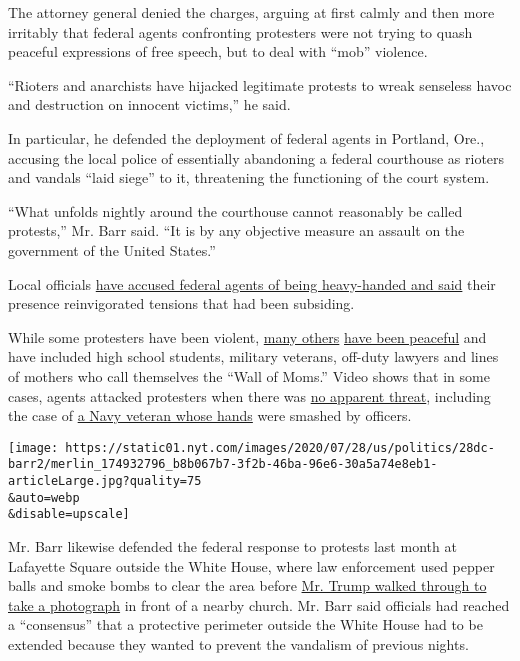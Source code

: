 The attorney general denied the charges, arguing at first calmly and
then more irritably that federal agents confronting protesters were not
trying to quash peaceful expressions of free speech, but to deal with
``mob'' violence.

``Rioters and anarchists have hijacked legitimate protests to wreak
senseless havoc and destruction on innocent victims,'' he said.

In particular, he defended the deployment of federal agents in Portland,
Ore., accusing the local police of essentially abandoning a federal
courthouse as rioters and vandals ``laid siege'' to it, threatening the
functioning of the court system.

``What unfolds nightly around the courthouse cannot reasonably be called
protests,'' Mr. Barr said. ``It is by any objective measure an assault
on the government of the United States.''

Local officials
\href{https://www.nytimes.com/article/portland-protests-explained-protesters.html}{have
accused federal agents of being heavy-handed and said} their presence
reinvigorated tensions that had been subsiding.

While some protesters have been violent,
\href{https://www.nytimes.com/2020/07/19/us/portland-protests.html}{many
others}
\href{https://www.nytimes.com/2020/07/27/us/protests-divisions-blm.html}{have
been peaceful} and have included high school students, military
veterans, off-duty lawyers and lines of mothers who call themselves the
``Wall of Moms.'' Video shows that in some cases, agents attacked
protesters when there was
\href{https://www.nytimes.com/video/us/100000007243995/portland-protests-federal-government.html?action=click\&gtype=vhs\&version=vhs-heading\&module=vhs\&region=title-area\&cview=true\&t=4}{no
apparent threat}, including the case of
\href{https://www.nytimes.com/2020/07/20/us/portland-protests-navy-christopher-david.html}{a
Navy veteran whose hands} were smashed by officers.

\texttt{[image: https://static01.nyt.com/images/2020/07/28/us/politics/28dc-barr2/merlin\_174932796\_b8b067b7-3f2b-46ba-96e6-30a5a74e8eb1-articleLarge.jpg?quality=75\\\&auto=webp\\\&disable=upscale]}

Mr. Barr likewise defended the federal response to protests last month
at Lafayette Square outside the White House, where law enforcement used
pepper balls and smoke bombs to clear the area before
\href{https://www.nytimes.com/2020/06/02/us/politics/trump-walk-lafayette-square.html}{Mr.
Trump walked through to take a photograph} in front of a nearby church.
Mr. Barr said officials had reached a ``consensus'' that a protective
perimeter outside the White House had to be extended because they wanted
to prevent the vandalism of previous nights.

